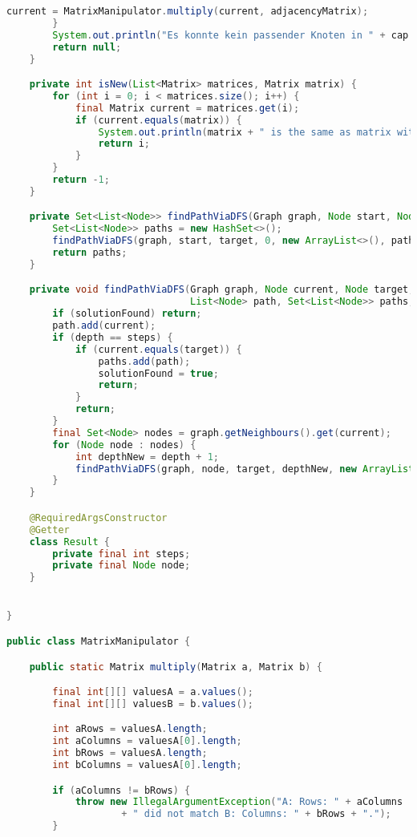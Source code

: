 \begin{lstlisting}[language=Java,label={lst:sourcecode}]
            current = MatrixManipulator.multiply(current, adjacencyMatrix);
        }
        System.out.println("Es konnte kein passender Knoten in " + cap + " Schritten ermittelt werden!");
        return null;
    }

    private int isNew(List<Matrix> matrices, Matrix matrix) {
        for (int i = 0; i < matrices.size(); i++) {
            final Matrix current = matrices.get(i);
            if (current.equals(matrix)) {
                System.out.println(matrix + " is the same as matrix with index " + i + ": " + current);
                return i;
            }
        }
        return -1;
    }

    private Set<List<Node>> findPathViaDFS(Graph graph, Node start, Node target, int steps) {
        Set<List<Node>> paths = new HashSet<>();
        findPathViaDFS(graph, start, target, 0, new ArrayList<>(), paths, steps);
        return paths;
    }

    private void findPathViaDFS(Graph graph, Node current, Node target, int depth,
                                List<Node> path, Set<List<Node>> paths, int steps) {
        if (solutionFound) return;
        path.add(current);
        if (depth == steps) {
            if (current.equals(target)) {
                paths.add(path);
                solutionFound = true;
                return;
            }
            return;
        }
        final Set<Node> nodes = graph.getNeighbours().get(current);
        for (Node node : nodes) {
            int depthNew = depth + 1;
            findPathViaDFS(graph, node, target, depthNew, new ArrayList<>(path), paths, steps);
        }
    }

    @RequiredArgsConstructor
    @Getter
    class Result {
        private final int steps;
        private final Node node;
    }


}

public class MatrixManipulator {

    public static Matrix multiply(Matrix a, Matrix b) {

        final int[][] valuesA = a.values();
        final int[][] valuesB = b.values();

        int aRows = valuesA.length;
        int aColumns = valuesA[0].length;
        int bRows = valuesA.length;
        int bColumns = valuesA[0].length;

        if (aColumns != bRows) {
            throw new IllegalArgumentException("A: Rows: " + aColumns
                    + " did not match B: Columns: " + bRows + ".");
        }


\end{lstlisting}
